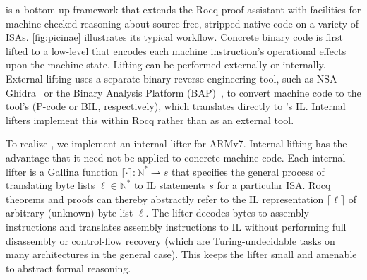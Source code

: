 \Picinae{} is a bottom-up \FMs framework that extends the Rocq proof assistant with facilities for machine-checked reasoning about source-free, stripped native code on a variety of ISAs\@.
\autoref{fig:picinae} illustrates its typical workflow.
Concrete binary code is first lifted to a low-level \IL that encodes each machine instruction's operational effects upon the machine state.
Lifting can be performed externally or internally.
External lifting uses a separate binary reverse-engineering tool, such as NSA Ghidra~\cite{ghidra} or the Binary Analysis Platform (BAP)~\cite{brumley11cav}, to convert machine code to the tool's \IL (P-code or BIL, respectively), which translates directly to \Picinae{}'s IL\@.
Internal lifters implement this within Rocq rather than as an external tool.

To realize \pname, we implement an internal lifter for ARMv7\@.
Internal lifting has the advantage that it need not be applied to concrete machine code.
Each internal lifter is a Gallina function $\lceil\cdot\rceil:\mathbb{N}^*\rightharpoonup s$ that specifies the general process of translating byte lists $\ell\in\mathbb{N}^*$ to IL statements $s$ for a particular ISA\@.
Rocq theorems and proofs can thereby abstractly refer to the IL representation $\lceil\ell\rceil$ of arbitrary (unknown) byte list $\ell$.
The lifter decodes bytes to assembly instructions and translates assembly instructions to IL without performing full disassembly or control-flow recovery (which are Turing-undecidable tasks on many architectures in the general case).
This keeps the lifter small and amenable to abstract formal reasoning.

%


